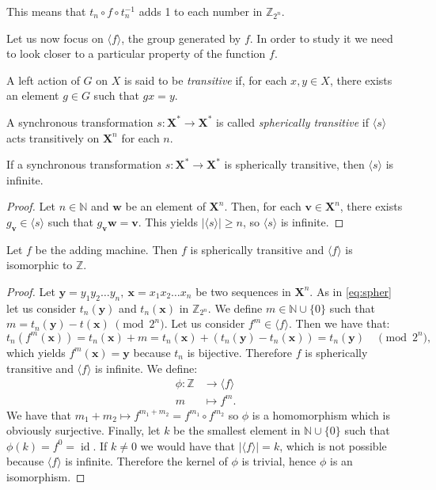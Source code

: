 \documentclass[mat1]{fmfdeloTS2.0}
\newcommand{\N}{\mathbb N}
\newcommand{\Z}{\mathbb Z}
\newcommand{\word}{\mathbf}				%
\newcommand{\abece}{\mathbf{X}}			%
\newcommand{\fslovar}{\mathbf{X^*}}		%
\DeclareMathOperator{\id}{\mathrm{id}}			%
\begin{document}
This means that $t_n\circ f\circ t_{n}^{-1}$ adds 1 to each number in $\Z_{2^n}$. 

Let us now focus on $\langle f\rangle $, the group generated by $f$. In order to study it we need to look closer to a particular property of the function $f$.

\begin{definition}
A left action of $G$ on $X$ is said to be \emph{transitive} if, for each $x,y\in X$, there exists an element $g\in G$ such that $gx=y$.
\end{definition}

\begin{definition}
A synchronous transformation $s:\fslovar\longrightarrow\fslovar$ is called \emph{spherically transitive} if $\langle s\rangle $ acts transitively on $\abece^n$ for each $n$.
\label{def:spherically transitive}
\end{definition}

\begin{proposition}
If a synchronous transformation $s:\fslovar\longrightarrow\fslovar$ is spherically transitive, then $\langle s\rangle $ is infinite.
\end{proposition}
\begin{proof}
Let $n\in\N$ and $\word{w}$ be an element of $\abece^n$. Then, for each $\word{v}\in\abece^n$, there exists $g_{\word{v}}\in \langle s\rangle$ such that $g_{\word{v}}\word{w}=\word{v}$. This yields $|\langle s\rangle|\geqslant n$, so $\langle s\rangle$ is infinite.
\end{proof}

\begin{proposition}
Let $f$ be the adding machine. Then $f$ is spherically transitive and $\langle f\rangle$ is isomorphic to $\Z$.
\end{proposition}
\begin{proof}
Let $\word{y}=y_1y_2\ldots y_n,\:\word{x}=x_1x_2\ldots x_n$ be two sequences in $\abece^n$. As in \eqref{eq:spher} let us consider $t_n(\word{y})$ and $t_n(\word{x})$ in $\Z_{2^n}$. We define $m\in\N\cup\{0\}$ such that $m=t_n(\word{y})-t(\word{x})\;\pmod {2^n}$. Let us consider $f^m\in\langle f\rangle$. Then we have that:
$$t_n(f^m(\word{x}))=t_n(\word{x})+m=t_n(\word{x}) +(t_n(\word{y})-t_n(\word{x}))=t_n(\word{y}) \quad\pmod {2^n} ,$$
which yields $f^m(\word{x})=\word{y}$ because $t_n$ is bijective. Therefore $f$ is spherically transitive and $\langle f\rangle$ is infinite.  We define:
\begin{align*}
\phi:\Z&\longrightarrow  \langle f \rangle\\
m&\longmapsto f^m.
\end{align*}
We have that $ m_1+m_2\mapsto f^{m_1+m_2}=f^{m_1}\circ f^{m_2}$ so $\phi$ is a homomorphism which is obviously surjective. Finally, let $k$ be the smallest element in $\N\cup\{0\}$ such that $\phi(k)=f^0=\id$. If $k\neq 0$ we would have that $|\langle f \rangle|=k$, which is not possible because $\langle f \rangle$ is infinite. Therefore the kernel of $\phi$ is trivial, hence $\phi$ is an isomorphism. 
\end{proof}
\end{document}
